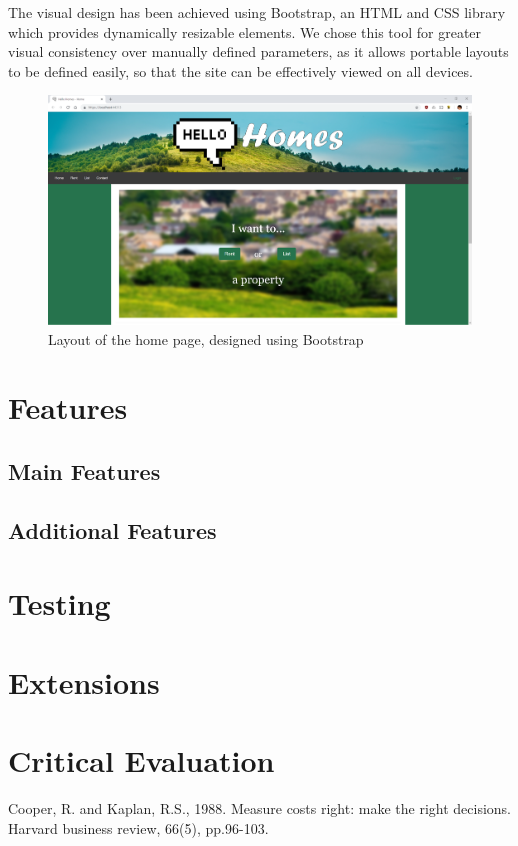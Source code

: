 \documentclass{article}
\begin{document}
    \par
        The visual design has been achieved using Bootstrap, an HTML and CSS library which provides dynamically resizable elements.
        We chose this tool for greater visual consistency over manually defined parameters, as it allows portable layouts to be defined easily, so that the site can be effectively viewed on all devices.

        \begin{figure}[ht]
            \centering
            \includegraphics[width=\textwidth]{figures/index_page.png}
            \caption[Home page layout]{Layout of the home page, designed using Bootstrap}
            \label{fig:index_page}
        \end{figure}

\section{Features}
    \subsection{Main Features}

    \subsection{Additional Features}

\section{Testing}

\section{Extensions}

\section{Critical Evaluation}

\begin{thebibliography}{1}
        Cooper, R. and Kaplan, R.S., 1988. Measure costs right: make the right decisions. Harvard business review, 66(5), pp.96-103.
\end{thebibliography}
\end{document}
